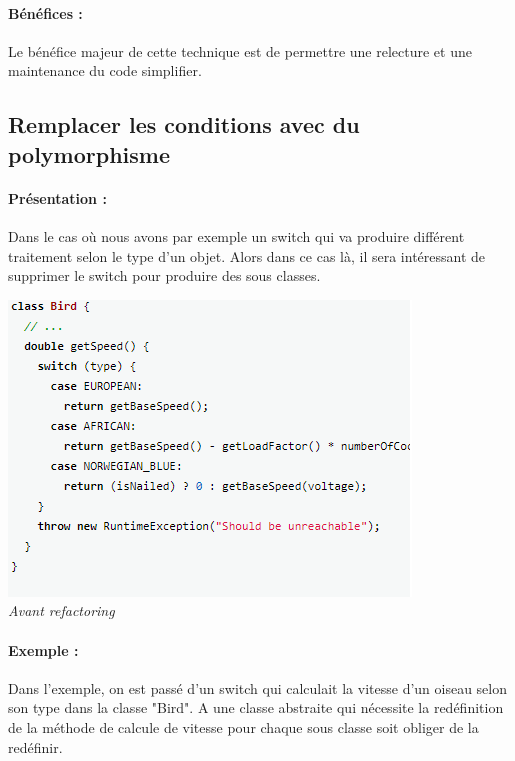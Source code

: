 \documentclass[a4paper,twoside,12pt,openright]{report}
\begin{document}
\paragraph{Bénéfices :}
Le bénéfice majeur de cette technique est de permettre une relecture et une maintenance du code simplifier.\\

\subsection{Remplacer les conditions avec du polymorphisme}
\paragraph{Présentation :}
Dans le cas où nous avons par exemple un switch qui va produire différent traitement selon le type d'un objet. Alors dans ce cas là, il sera intéressant de supprimer le switch pour produire des sous classes.

\begin{center}
\includegraphics[scale=1]{Image/ReplaceConditionalPoly.png}\\
\itshape{Avant refactoring \cite{ref5}}
\end{center}

\paragraph{Exemple :}
Dans l'exemple, on est passé d'un switch qui calculait la vitesse d'un oiseau selon son type dans la classe "Bird". A une classe abstraite qui nécessite la redéfinition de la méthode de calcule de vitesse pour chaque sous classe soit obliger de la redéfinir.
\end{document}
